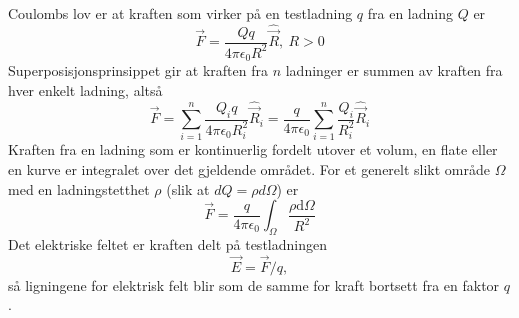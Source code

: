 \noindent Coulombs lov er at kraften som virker på en testladning $q$ fra en ladning $Q$ er 
\begin{equation}
	\vec{F}=\frac{Qq}{4\pi\epsilon_0R^2}\hat{\vec{R}},\ R>0
\end{equation}
Superposisjonsprinsippet gir at kraften fra $n$ ladninger er summen av kraften fra hver enkelt ladning, altså 
\begin{equation}
	\vec{F}=\sum_{i=1}^n \frac{Q_iq}{4\pi\epsilon_0R_i^2}\hat{\vec{R}}_i=\frac{q}{4\pi\epsilon_0}\sum_{i=1}^n\frac{Q_i}{R_i^2}\hat{\vec{R}}_i
\end{equation}
Kraften fra en ladning som er kontinuerlig fordelt utover et volum, en flate eller en kurve er integralet over det gjeldende området. For et generelt slikt område $\Omega$ med en ladningstetthet $\rho$ (slik at $dQ=\rho d\Omega$) er
\begin{equation}
	\vec{F}=\frac{q}{4\pi\epsilon_0}\int_\Omega \frac{\rho\text{d}\Omega}{R^2}
\end{equation}
Det elektriske feltet er kraften delt på testladningen
\begin{equation}
	\vec{E}=\vec{F}/q,	
\end{equation}
så ligningene for elektrisk felt blir som de samme for kraft bortsett fra en faktor $q$.

